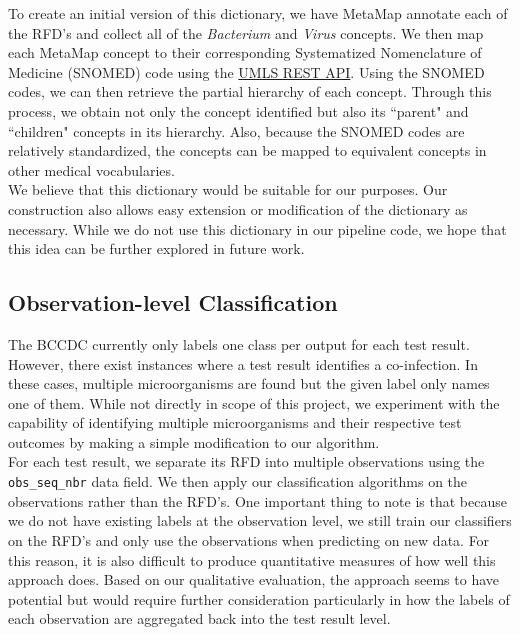 \documentclass[11pt]{article}
\begin{document}
To create an initial version of this dictionary, we have MetaMap annotate each of the RFD's and collect all of the \textit{Bacterium} and \textit{Virus} concepts. We then map each MetaMap concept to their corresponding Systematized Nomenclature of Medicine (SNOMED) code using the \href{https://documentation.uts.nlm.nih.gov/rest/home.html}{UMLS REST API}. Using the SNOMED codes, we can then retrieve the partial hierarchy of each concept. Through this process, we obtain not only the concept identified but also its ``parent" and ``children" concepts in its hierarchy. Also, because the SNOMED codes are relatively standardized, the concepts can be mapped to equivalent concepts in other medical vocabularies.
\\

We believe that this dictionary would be suitable for our purposes. Our construction also allows easy extension or modification of the dictionary as necessary. While we do not use this dictionary in our pipeline code, we hope that this idea can be further explored in future work. 


\subsection{Observation-level Classification} \label{observation-level classification}

The BCCDC currently only labels one class per output for each test result. However, there exist instances where a test result identifies a co-infection. In these cases, multiple microorganisms are found but the given label only names one of them. While not directly in scope of this project, we experiment with the capability of identifying multiple microorganisms and their respective test outcomes by making a simple modification to our algorithm.
\\

For each test result, we separate its RFD into multiple observations using the \verb|obs_seq_nbr| data field. We then apply our classification algorithms on the observations rather than the RFD's. One important thing to note is that because we do not have existing labels at the observation level, we still train our classifiers on the RFD's and only use the observations when predicting on new data. For this reason, it is also difficult to produce quantitative measures of how well this approach does. Based on our qualitative evaluation, the approach seems to have potential but would require further consideration particularly in how the labels of each observation are aggregated back into the test result level.
\end{document}
